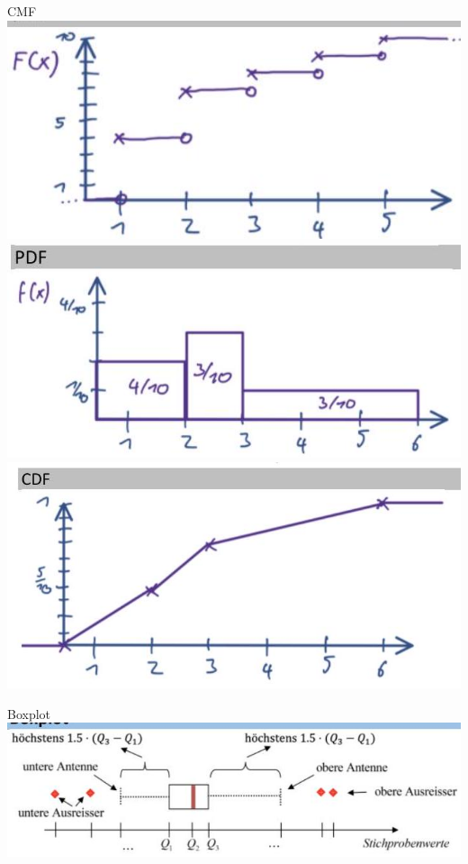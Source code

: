\documentclass[10pt]{article}
\begin{document}
CMF\\
\includegraphics[max width=\textwidth, center]{2024_12_29_0906b02acf849bda8665g-1(4)}\\
\includegraphics[max width=\textwidth, center]{2024_12_29_0906b02acf849bda8665g-1(3)}\\
\includegraphics[max width=\textwidth, center]{2024_12_29_0906b02acf849bda8665g-1}

Boxplot\\
\includegraphics[max width=\textwidth, center]{2024_12_29_0906b02acf849bda8665g-1(5)}
\end{document}
